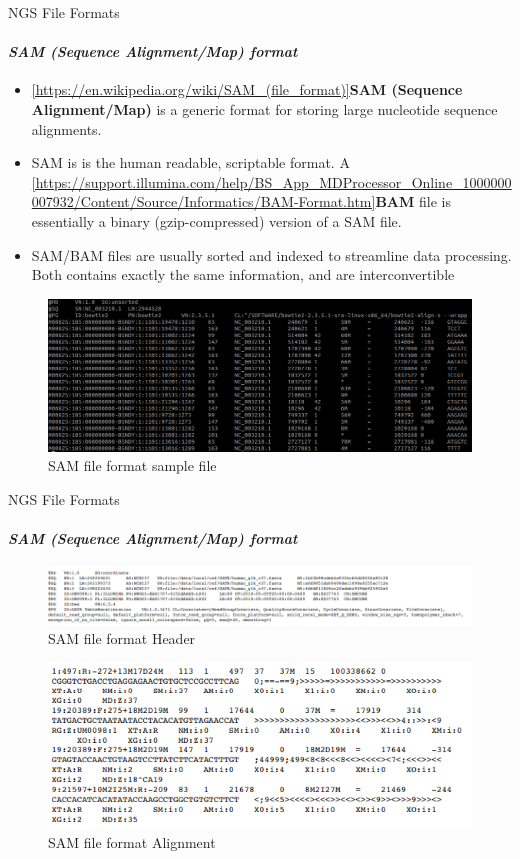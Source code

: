 \documentclass{if-beamer}
\begin{document}
\begin{frame}{NGS File Formats}
\framesubtitle{\emph{SAM (Sequence Alignment/Map) format}}
\begin{itemize}
    \item \cref{https://en.wikipedia.org/wiki/SAM_(file_format)}{\textbf{SAM (Sequence Alignment/Map)}} is a generic format for storing large nucleotide sequence
    alignments.
    \item SAM is is the human readable, scriptable format. A \cref{https://support.illumina.com/help/BS_App_MDProcessor_Online_1000000007932/Content/Source/Informatics/BAM-Format.htm}{\textbf{BAM}} file is essentially a binary (gzip-compressed) version of a SAM file.
    \item  SAM/BAM files are usually sorted and indexed to streamline data
    processing. Both contains exactly the same information, and are interconvertible
\end{itemize} 
\begin{figure}
\centering
\includegraphics[scale=0.3]{sam_listeria.PNG}
\caption{SAM file format sample file}
\end{figure}
\end{frame}
\begin{frame}{NGS File Formats}
\framesubtitle{\emph{SAM (Sequence Alignment/Map) format}}
\begin{figure}
\centering
\includegraphics[scale=0.5]{sam_header.PNG}
\caption{SAM file format Header}
\end{figure}
\begin{figure}
\centering
\includegraphics[scale=0.6]{sam_alignment.PNG}
\caption{SAM file format Alignment}
\end{figure}
\end{frame}
\end{document}
